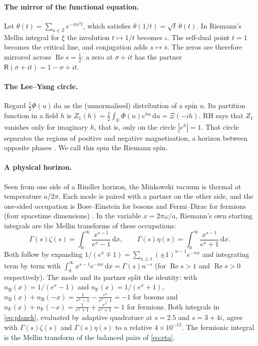 \documentclass[11pt]{article}
\theoremstyle{definition}\newtheorem{definition}[theorem]{Definition}
\theoremstyle{remark}\newtheorem{remark}[theorem]{Remark}
\newcommand{\R}{\mathbb R}\newcommand{\C}{\mathbb C}\newcommand{\N}{\mathbb N}
\newcommand{\dd}{\,\mathrm d}\newcommand{\e}{\mathrm e}
\renewcommand{\Re}{\operatorname{Re}}\renewcommand{\Im}{\operatorname{Im}}
\begin{document}
\paragraph{The mirror of the functional equation.} Let $\theta(t)=\sum_{n\in\mathbb Z}e^{-\pi n^2t}$, which satisfies $\theta(1/t)=\sqrt t\,\theta(t)$. In Riemann's Mellin integral for $\xi$ the involution $t\mapsto1/t$ becomes $\iota$. The self-dual point $t=1$ becomes the critical line, and conjugation adds $s\mapsto\bar s$. The zeros are therefore mirrored across $\Re s=\tfrac12$: a zero at $\sigma+it$ has the partner $\mathsf R(\sigma+it)=1-\sigma+it$.

\paragraph{The Lee--Yang circle.} Regard $\frac12\Phi(u)\dd u$ as the (unnormalised) distribution of a spin $u$. Its partition function in a field $h$ is $Z_1(h)=\frac12\int_\R\Phi(u)e^{hu}\dd u=\Xi(-ih)$. RH says that $Z_1$ vanishes only for imaginary $h$, that is, only on the circle $|e^h|=1$. That circle separates the regions of positive and negative magnetisation, a horizon between opposite phases \cite{LeeYang,Newman74,NewmanWu}. We call this spin the Riemann spin.

\paragraph{A physical horizon.} Seen from one side of a Rindler horizon, the Minkowski vacuum is thermal at temperature $a/2\pi$. Each mode is paired with a partner on the other side, and the one-sided occupation is Bose--Einstein for bosons and Fermi--Dirac for fermions (four spacetime dimensions) \cite{Unruh,Takagi}. In the variable $x=2\pi\omega/a$, Riemann's own starting integrals are the Mellin transforms of these occupations:
\begin{equation}\label{eq:planck}
\Gamma(s)\zeta(s)=\int_0^\infty\frac{x^{s-1}}{e^x-1}\dd x,\qquad \Gamma(s)\eta(s)=\int_0^\infty\frac{x^{s-1}}{e^x+1}\dd x .
\end{equation}
Both follow by expanding $1/(e^x\mp1)=\sum_{n\ge1}(\pm1)^{n-1}e^{-nx}$ and integrating term by term with $\int_0^\infty x^{s-1}e^{-nx}\dd x=\Gamma(s)n^{-s}$ (for $\Re s>1$ and $\Re s>0$ respectively). The mode and its partner split the identity: with $n_{\mathrm B}(x)=1/(e^x-1)$ and $n_{\mathrm F}(x)=1/(e^x+1)$, $n_{\mathrm B}(x)+n_{\mathrm B}(-x)=\frac1{e^x-1}-\frac{e^x}{e^x-1}=-1$ for bosons and $n_{\mathrm F}(x)+n_{\mathrm F}(-x)=\frac1{e^x+1}+\frac{e^x}{e^x+1}=1$ for fermions. Both integrals in \eqref{eq:planck}, evaluated by adaptive quadrature at $s=2.5$ and $s=3+4i$, agree with $\Gamma(s)\zeta(s)$ and $\Gamma(s)\eta(s)$ to a relative $4\times10^{-15}$. The fermionic integral is the Mellin transform of the balanced pairs of \eqref{eq:eta}.
\end{document}

